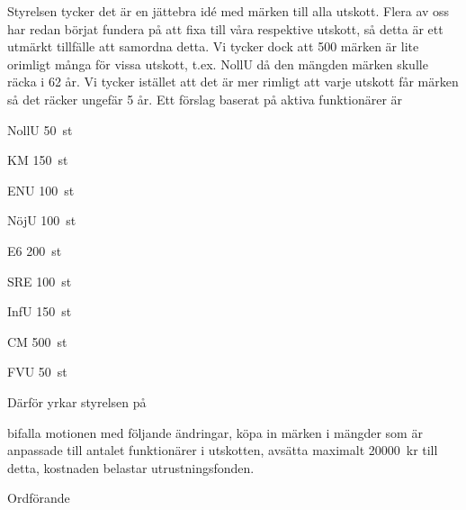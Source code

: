 \documentclass[../_main/handlingar.tex]{subfiles}
\begin{document}
\motionssvar

Styrelsen tycker det är en jättebra idé med märken till alla utskott. Flera av oss har redan börjat fundera på att fixa till våra respektive utskott, så detta är ett utmärkt tillfälle att samordna detta.
Vi tycker dock att 500 märken är lite orimligt många för vissa utskott, t.ex. NollU då den mängden märken skulle räcka i 62 år. Vi tycker istället att det är mer rimligt att varje utskott får märken så det räcker ungefär 5 år. Ett förslag baserat på aktiva funktionärer är

\begin{emptylist}
    \item NollU \SI{50}{st}
    \item KM \SI{150}{st}
    \item ENU \SI{100}{st}
    \item NöjU \SI{100}{st}
    \item E6 \SI{200}{st}
    \item SRE \SI{100}{st}
    \item InfU \SI{150}{st}
    \item CM \SI{500}{st}
    \item FVU \SI{50}{st}
\end{emptylist}

Därför yrkar styrelsen på 

\begin{attsatser}
    \att bifalla motionen med följande ändringar,
    \att köpa in märken i mängder som är anpassade till antalet funktionärer i utskotten,
    \att avsätta maximalt \SI{20 000}{kr} till detta,
    \att kostnaden belastar utrustningsfonden.
\end{attsatser}

\begin{signatures}{1}
    \ist
    \signature{Daniel Bakic}{Ordförande}
\end{signatures}
\end{document}
